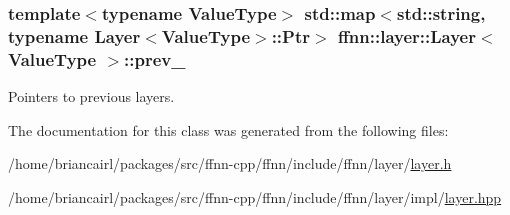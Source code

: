 \hypertarget{classffnn_1_1layer_1_1_layer_ab1546472cf5b9c87aed6f75852e123c7}{
\subsubsection[{prev\-\_\-}]{\setlength{\rightskip}{0pt plus 5cm}template$<$typename Value\-Type$>$ std\-::map$<$std\-::string, typename {\bf Layer}$<$Value\-Type$>$\-::{\bf Ptr}$>$ {\bf ffnn\-::layer\-::\-Layer}$<$ Value\-Type $>$\-::prev\-\_\-\hspace{0.3cm}{\ttfamily [protected]}}}\label{classffnn_1_1layer_1_1_layer_ab1546472cf5b9c87aed6f75852e123c7}


Pointers to previous layers. 



The documentation for this class was generated from the following files\-:\begin{DoxyCompactItemize}
\item 
/home/briancairl/packages/src/ffnn-\/cpp/ffnn/include/ffnn/layer/\hyperlink{layer_8h}{layer.\-h}\item 
/home/briancairl/packages/src/ffnn-\/cpp/ffnn/include/ffnn/layer/impl/\hyperlink{layer_8hpp}{layer.\-hpp}\end{DoxyCompactItemize}
